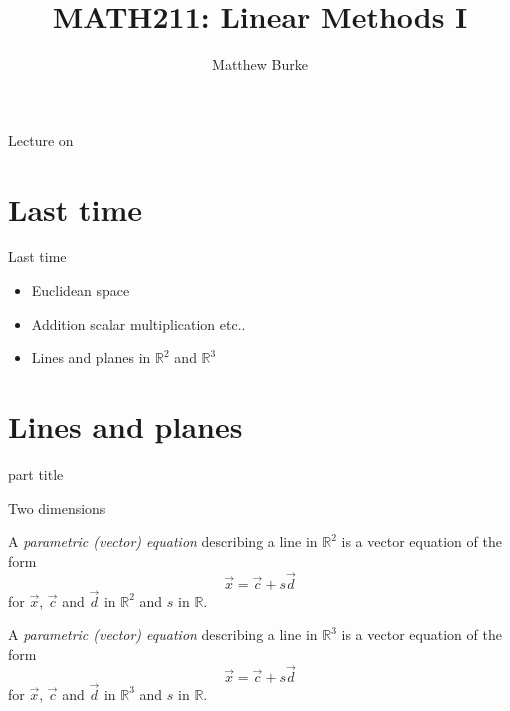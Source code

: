 \documentclass{beamer}
\title{MATH211: Linear Methods I}
\author{Matthew Burke}
\date{\lectureDate}
\newcommand{\lectureDate}{\formatdate{09}{10}{2018}}
\begin{document}
\frame{\titlepage}

\begin{frame}{Lecture on \lectureDate}
  \tableofcontents
\end{frame}

\section*{Last time}
\label{sec:Last-time}

\begin{frame}{Last time}
  \begin{itemize}
  \item Euclidean space\vfill
  \item Addition scalar multiplication etc..\vfill
  \item Lines and planes in $\mathbb R^2$ and \(\mathbb R^3\)
  \end{itemize}
\end{frame}

\section{Lines and planes}

\begin{frame}
  \begin{beamercolorbox}[sep=12pt,center]{part title}
    \insertsection\par
  \end{beamercolorbox}
\end{frame}

\begin{frame}{Two dimensions}
  \begin{definition}
    A \emph{parametric (vector) equation} describing a line in $\mathbb R^2$ is a vector equation of the form
    \begin{equation*}
      \vec{x} = \vec{c}+s\vec{d}
    \end{equation*}
    for $\vec{x}$, $\vec{c}$ and $\vec{d}$ in $\mathbb R^2$ and $s$ in $\mathbb R$.
  \end{definition}\vfill
  \begin{definition}
    A \emph{parametric (vector) equation} describing a line in $\mathbb R^3$ is a vector equation of the form
    \begin{equation*}
      \vec{x} = \vec{c}+s\vec{d}
    \end{equation*}
    for $\vec{x}$, $\vec{c}$ and $\vec{d}$ in $\mathbb R^3$ and $s$ in $\mathbb R$.
  \end{definition}
\end{frame}
\end{document}
